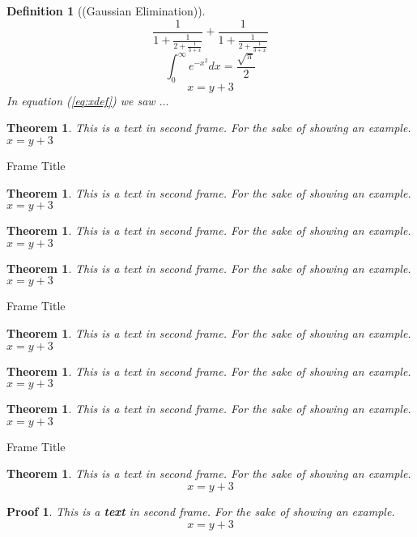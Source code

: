 \documentclass[10pt]{beamer}
\renewcommand{\emph}[1]{\textbf{\color{color5}#1}}
\newtheorem{mysol}{Proof}[section]
\newtheorem{mydef}{Definition}[section]
\newtheorem{mylem}{Theorem}[section]
\newtheorem{mycol}{Theorem}[section]
\newtheorem{myfact}{Theorem}[section]
\newtheorem{mypro}{Theorem}[section]
\newtheorem{mycon}{Theorem}[section]
\newtheorem{myclaim}{Theorem}[section]
\newtheorem{myexa}{Theorem}[section]
\newtheorem{myrem}{Theorem}[section]
\begin{document}
\begin{frame}
  \begin{mydef}[(Gaussian Elimination)]
    $$
 \frac{1}{\displaystyle 1+
   \frac{1}{\displaystyle 2+
   \frac{1}{\displaystyle 3+x}}} +
 \frac{1}{1+\frac{1}{2+\frac{1}{3+x}}}
$$
$$\int_0^\infty e^{-x^2} dx=\frac{\sqrt{\pi}}{2}$$
\begin{equation} x=y+3 \label{eq:xdef}
\end{equation}
In equation (\ref{eq:xdef}) we saw $\dots$
  \end{mydef}

  \begin{myrem}
        This is a text in second frame.
        For the sake of showing an example.
        $x=y+3$
  \end{myrem}
  
\end{frame}

\begin{frame}{Frame Title}
    \begin{myexa}
        This is a text in second frame.
        For the sake of showing an example.
        $x=y+3$
    \end{myexa}

    \begin{mycol}
        This is a text in second frame.
        For the sake of showing an example.
        $x=y+3$
    \end{mycol}

    \begin{mylem}
        This is a text in second frame.
        For the sake of showing an example.
        $x=y+3$
    \end{mylem}
\end{frame}

\begin{frame}{Frame Title}
    \begin{myfact}
        This is a text in second frame.
        For the sake of showing an example.
        $x=y+3$
    \end{myfact}

    \begin{mycon}
        This is a text in second frame.
        For the sake of showing an example.
        $x=y+3$
    \end{mycon}

    \begin{mypro}
        This is a text in second frame.
        For the sake of showing an example.
        $x=y+3$
    \end{mypro}
\end{frame}

\begin{frame}{Frame Title}
    \begin{myclaim}
        This is a text in second frame.
        For the sake of showing an example.
        $$x=y+3$$
    \end{myclaim}

    \begin{mysol}
        This is a \emph{text} in second frame.
        For the sake of showing an example.
        $$x=y+3$$
    \end{mysol}
\end{frame}
\end{document}
